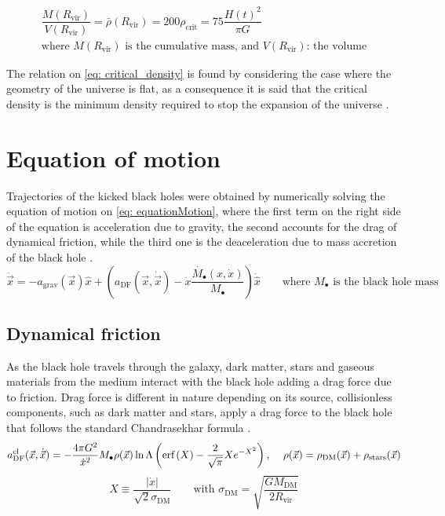 		\begin{equation}\label{eq: R_vir_def}
			\begin{array}{c}
				\dfrac{M(R_\text{vir})}{V(R_\text{vir})} = \bar{\rho}(R_\text{vir}) =  200 \rho_\text{crit} = 75\dfrac{H(t)^2}{\pi G}\\
				\text{where $M(R_\text{vir})$ is the cumulative mass, and $V(R_\text{vir})$: the volume}
			\end{array}			
		\end{equation}
		
		The relation on \autoref{eq: critical_density} is found by considering the case where the geometry of the universe is flat, as a consequence it is said that the critical density is the minimum density required to stop the expansion of the universe \cite{binney2011galactic}.
		
	\section{Equation of motion}
		Trajectories of the kicked black holes were obtained by numerically solving the equation of motion on \autoref{eq: equationMotion}, where the first term on the right side of the equation is acceleration due to gravity, the second accounts for the drag of dynamical friction, while the third one is the deaceleration due to mass accretion of the black hole \cite{tanaka2009assembly, choksi2017recoiling}.
		\begin{equation}\label{eq: equationMotion}
			\ddot{\vec{x}} = -a_\text{grav}(\vec{x})\hat{x} + \left(a_\text{DF}(\vec{x}, \dot{\vec{x}})-\dot{x}\dfrac{\dot{M_\bullet}(x, \dot{x})}{M_\bullet}\right)\dot{\hat{x}} \qquad \text{where $M_\bullet$ is the black hole mass}
		\end{equation}
		
		\subsection{Dynamical friction}
			As the black hole travels through the galaxy, dark matter, stars and gaseous materials from the medium interact with the black hole adding a drag force due to friction. Drag force is different in nature depending on its source, collisionless components, such as dark matter and stars, apply a drag force to the black hole that follows the standard Chandrasekhar formula \cite{binney2011galactic, madau2004effect, tanaka2009assembly, choksi2017recoiling}.
			\begin{equation}
				a_\text{DF}^\text{cl}(\vec{x}, \dot{\vec{x}}) = -\dfrac{4\pi G^2}{\dot{x}^2} M_\bullet\rho(\vec{x})\ln\Lambda\left(\text{erf}\left(X\right) - \dfrac{2}{\sqrt{\pi}}Xe^{-X^2}\right)\text{, } \quad \rho(\vec{x}) = \rho_\text{DM}(\vec{x}) + \rho_\text{stars}(\vec{x})
			\end{equation}
			\begin{equation}
				X \equiv \dfrac{|\dot{x}|}{\sqrt{2}\sigma_\text{DM}} \qquad \text{with } \sigma_\text{DM} = \sqrt{\dfrac{GM_\text{DM}}{2R_\text{vir}}}
			\end{equation}
			
